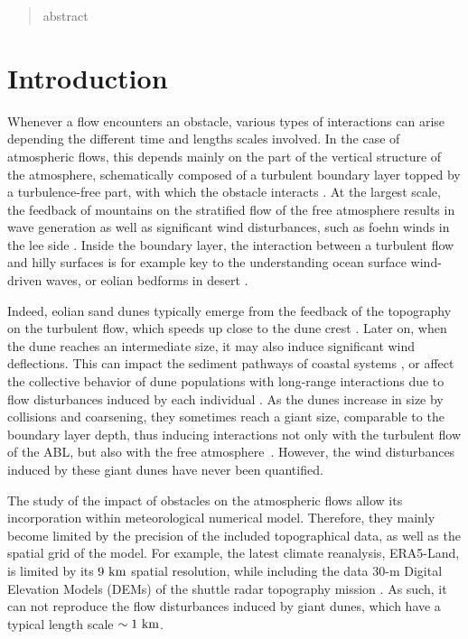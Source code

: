 \begin{abstract}
  abstract
\end{abstract}

\newpage

\section{Introduction}

Whenever a flow encounters an obstacle, various types of interactions can arise depending the different time and lengths scales involved. In the case of atmospheric flows, this depends mainly on the part of the vertical structure of the atmosphere, schematically composed of a turbulent boundary layer topped by a turbulence-free part, with which the obstacle interacts \citep{Stull1988}.
%
At the largest scale, the feedback of mountains on the stratified flow of the free atmosphere results in wave generation as well as significant wind disturbances, such as foehn winds in the lee side \citep{refs}. Inside the boundary layer, the interaction between a turbulent flow and hilly surfaces is for example key to the understanding ocean surface wind-driven waves, or eolian bedforms in desert \citep{Belcher1998, Sullivan2010, Courrech2015}.

Indeed, eolian sand dunes typically emerge from the feedback of the topography on the turbulent flow, which speeds up close to the dune crest \citep{Rubin1987, Charru2013, Courrech2014}. Later on, when the dune reaches an intermediate size, it may also induce significant wind deflections. This can impact the sediment pathways of coastal systems \citep{Hesp2015}, or affect the collective behavior of dune populations with long-range interactions due to flow disturbances induced by each individual \citep{Smith2017, Bacik2020}. As the dunes increase in size by collisions and coarsening, they sometimes reach a giant size, comparable to the boundary layer depth, thus inducing interactions not only with the turbulent flow of the ABL, but also with the free atmosphere~\citep{andreotti2009}. However, the wind disturbances induced by these giant dunes have never been quantified.

The study of the impact of obstacles on the atmospheric flows allow its incorporation within meteorological numerical model. Therefore, they mainly become limited by the precision of the included topographical data, as well as the spatial grid of the model. For example, the latest climate reanalysis, ERA5-Land, is limited by its $9~\textup{km}$ spatial resolution, while including the data $30$-m Digital Elevation Models (DEMs) of the shuttle radar topography mission \citep{Farr2007, munoz2021}. As such, it can not reproduce the flow disturbances induced by giant dunes, which have a typical length scale $\sim 1~\textup{km}$.

